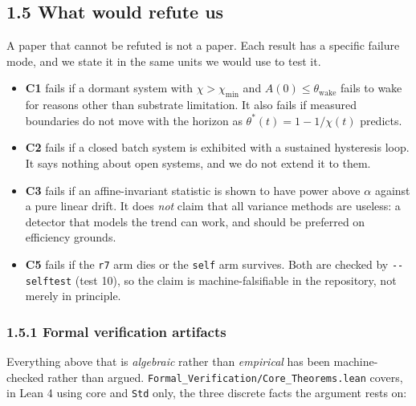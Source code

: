 \documentclass[11pt,a4paper]{article}
\providecommand{\tightlist}{\setlength{\itemsep}{0pt}\setlength{\parskip}{0pt}}
\begin{document}
\subsection{1.5 What would refute us}\label{what-would-refute-us}

A paper that cannot be refuted is not a paper. Each result has a specific
failure mode, and we state it in the same units we would use to test it.

\begin{itemize}
\tightlist
\item
  \textbf{C1} fails if a dormant system with \(\chi>\chi_{\min}\) and
  \(A(0)\le\theta_{\mathrm{wake}}\) fails to wake for reasons other than substrate
  limitation. It also fails if measured boundaries do not move with the horizon
  as \(\theta^\ast(t)=1-1/\chi(t)\) predicts.
\item
  \textbf{C2} fails if a closed batch system is exhibited with a sustained hysteresis
  loop. It says nothing about open systems, and we do not extend it to them.
\item
  \textbf{C3} fails if an affine-invariant statistic is shown to have power above
  \(\alpha\) against a pure linear drift. It does \emph{not} claim that all variance
  methods are useless: a detector that models the trend can work, and should be
  preferred on efficiency grounds.
\item
  \textbf{C5} fails if the \texttt{r7} arm dies or the \texttt{self} arm survives. Both are checked
  by \texttt{-\/-selftest} (test 10), so the claim is machine-falsifiable in the
  repository, not merely in principle.
\end{itemize}

\subsubsection{1.5.1 Formal verification artifacts}\label{formal-verification-artifacts}

Everything above that is \emph{algebraic} rather than \emph{empirical} has been
machine-checked rather than argued. \texttt{Formal\_Verification/Core\_Theorems.lean}
covers, in Lean 4 using core and \texttt{Std} only, the three discrete facts the
argument rests on:
\end{document}
